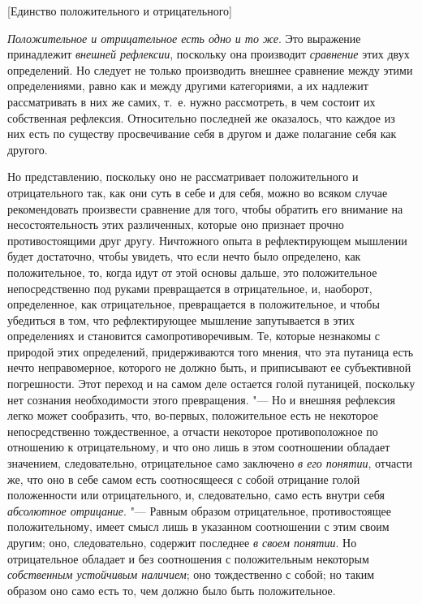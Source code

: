 %
  {[Единство положительного и отрицательного]}

{\em Положительное и отрицательное есть одно и то же}.
Это выражение принадлежит {\em внешней рефлексии},
поскольку она производит {\em сравнение} этих двух
определений. Но следует не только производить внешнее сравнение между этими
определениями, равно как и между другими категориями, а их надлежит
рассматривать в них же самих, т.~е. нужно рассмотреть, в чем состоит их
собственная рефлексия. Относительно последней же оказалось, что каждое из
них есть по существу просвечивание себя в другом и даже полагание себя как
другого.

Но представлению, поскольку оно не рассматривает положительного и
отрицательного так, как они суть в себе и для себя, можно во всяком случае
рекомендовать произвести сравнение для того, чтобы обратить его внимание на
несостоятельность этих различенных, которые оно признает прочно
противостоящими друг другу. Ничтожного опыта в рефлектирующем мышлении
будет достаточно, чтобы увидеть, что если нечто было определено, как
положительное, то, когда идут от этой основы дальше, это положительное
непосредственно под руками превращается в отрицательное, и, наоборот,
определенное, как отрицательное, превращается в положительное, и чтобы
убедиться в том, что рефлектирующее мышление запутывается в этих
определениях и становится самопротиворечивым. Те, которые незнакомы с
природой этих определений, придерживаются того мнения, что эта путаница
есть нечто неправомерное, которого не должно быть, и приписывают ее
субъективной погрешности. Этот переход и на самом деле остается голой
путаницей, поскольку нет сознания необходимости этого превращения. "--- Но и
внешняя рефлексия легко может сообразить, что, во-первых, положительное
есть не некоторое непосредственно тождественное, а отчасти некоторое
противоположное по отношению к отрицательному, и что оно лишь в этом
соотношении обладает значением, следовательно, отрицательное само заключено
{\em в его понятии}, отчасти
же, что оно в себе самом есть соотносящееся с собой отрицание голой
положенности или отрицательного, и, следовательно, само есть внутри себя
{\em абсолютное отрицание}. "--- Равным образом
отрицательное, противостоящее положительному, имеет смысл лишь в указанном
соотношении с этим своим другим; оно, следовательно, содержит последнее
{\em в своем понятии}. Но отрицательное обладает и без
соотношения с положительным некоторым {\em собственным
устойчивым наличием}; оно тождественно с собой; но таким образом оно само
есть то, чем должно было быть положительное.

